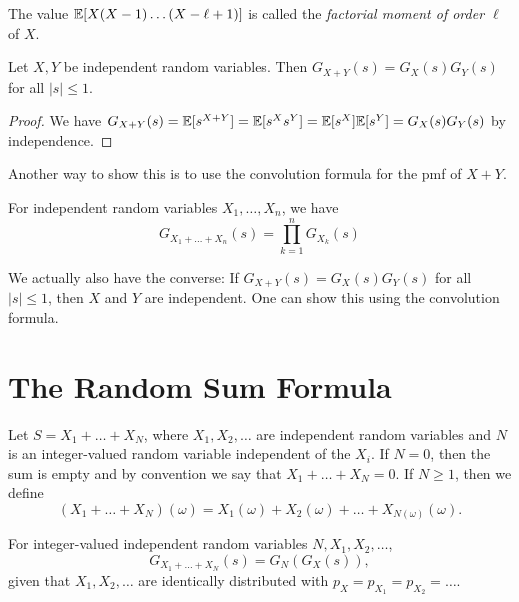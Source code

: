 \begin{remark}
  The value $\mathbb{E}[X(X - 1) \dots (X - \ell + 1)]$
  is called the \emph{factorial moment of order $\ell$} of $X$.
\end{remark}

\begin{theorem}
  Let $X, Y$ be independent random variables.
  Then $G_{X + Y}(s) = G_X(s) G_Y(s)$ for all $|s| \le 1$.
\end{theorem}

\begin{proof}
  We have $G_{X + Y}(s) = \mathbb{E}[s^{X + Y}] = \mathbb{E}[s^X s^Y] = \mathbb{E}[s^X] \mathbb{E}[s^Y] = G_X(s) G_Y(s)$
  by independence.
\end{proof}

\begin{remark}
  Another way to show this is to use the
  convolution formula for the pmf of $X + Y$.
\end{remark}

\begin{corollary}
  For independent random variables $X_1, \dots, X_n$,
  we have
  \[
    G_{X_1 + \dots + X_n}(s)
    = \prod_{k = 1}^n G_{X_k}(s)
  \]
\end{corollary}

\begin{remark}
  We actually also have the converse:
  If $G_{X + Y}(s) = G_X(s) G_Y(s)$ for all
  $|s| \le 1$, then $X$ and $Y$ are independent.
  One can show this using the convolution
  formula.
\end{remark}

\section{The Random Sum Formula}
Let $S = X_1 + \dots + X_N$, where $X_1, X_2, \dots$
are independent random variables and $N$ is
an integer-valued random variable independent
of the $X_i$. If
$N = 0$, then the sum is empty and by convention
we say that $X_1 + \dots + X_N = 0$. If $N \ge 1$,
then we define
\[
  (X_1 + \dots + X_N)(\omega)
  = X_1(\omega) + X_2(\omega) + \dots + X_{N(\omega)}(\omega).
\]

\begin{theorem}
  For integer-valued independent random variables $N, X_1, X_2, \dots$,
  \[
    G_{X_1 + \dots + X_N}(s) = G_N(G_{X}(s)),
  \]
  given that $X_1, X_2, \dots$ are
  identically distributed with $p_X = p_{X_1} = p_{X_2} = \dots$.
\end{theorem}

